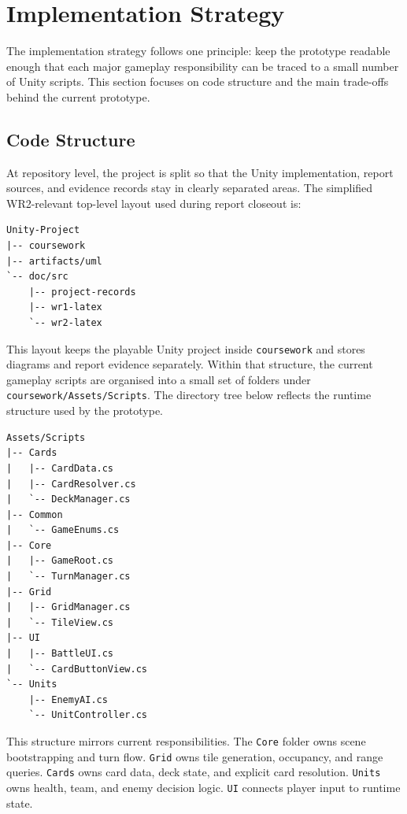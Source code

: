 \chapter{Implementation Strategy}

The implementation strategy follows one principle: keep the prototype readable enough that each major gameplay responsibility can be traced to a small number of Unity scripts. This section focuses on code structure and the main trade-offs behind the current prototype.

\section{Code Structure}

At repository level, the project is split so that the Unity implementation, report sources, and evidence records stay in clearly separated areas. The simplified WR2-relevant top-level layout used during report closeout is:

\begin{Verbatim}[fontsize=\small]
Unity-Project
|-- coursework
|-- artifacts/uml
`-- doc/src
    |-- project-records
    |-- wr1-latex
    `-- wr2-latex
\end{Verbatim}

This layout keeps the playable Unity project inside \texttt{coursework} and stores diagrams and report evidence separately. Within that structure, the current gameplay scripts are organised into a small set of folders under \texttt{coursework/Assets/Scripts}. The directory tree below reflects the runtime structure used by the prototype.

\begin{Verbatim}[fontsize=\small]
Assets/Scripts
|-- Cards
|   |-- CardData.cs
|   |-- CardResolver.cs
|   `-- DeckManager.cs
|-- Common
|   `-- GameEnums.cs
|-- Core
|   |-- GameRoot.cs
|   `-- TurnManager.cs
|-- Grid
|   |-- GridManager.cs
|   `-- TileView.cs
|-- UI
|   |-- BattleUI.cs
|   `-- CardButtonView.cs
`-- Units
    |-- EnemyAI.cs
    `-- UnitController.cs
\end{Verbatim}

This structure mirrors current responsibilities. The \texttt{Core} folder owns scene bootstrapping and turn flow. \texttt{Grid} owns tile generation, occupancy, and range queries. \texttt{Cards} owns card data, deck state, and explicit card resolution. \texttt{Units} owns health, team, and enemy decision logic. \texttt{UI} connects player input to runtime state.

